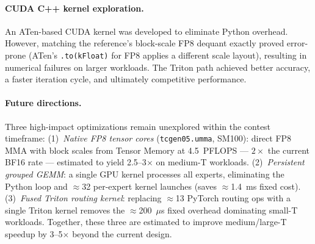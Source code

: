 \paragraph{CUDA C++ kernel exploration.}
An ATen-based CUDA kernel was developed to eliminate Python overhead.
However, matching the reference's block-scale FP8 dequant exactly proved error-prone (ATen's \texttt{.to(kFloat)} for FP8 applies a different scale layout), resulting in numerical failures on larger workloads.
The Triton path achieved better accuracy, a faster iteration cycle, and ultimately competitive performance.

\paragraph{Future directions.}
Three high-impact optimizations remain unexplored within the contest timeframe:
(1)~\emph{Native FP8 tensor cores} (\texttt{tcgen05.umma}, SM100): direct FP8 MMA with block scales from Tensor Memory at 4.5~PFLOPS --- $2\times$ the current BF16 rate --- estimated to yield 2.5--3$\times$ on medium-T workloads.
(2)~\emph{Persistent grouped GEMM}: a single GPU kernel processes all experts, eliminating the Python loop and ${\approx}$32 per-expert kernel launches (saves ${\approx}$1.4~ms fixed cost).
(3)~\emph{Fused Triton routing kernel}: replacing ${\approx}$13 PyTorch routing ops with a single Triton kernel removes the ${\approx}$200~$\mu$s fixed overhead dominating small-T workloads.
Together, these three are estimated to improve medium/large-T speedup by 3--5$\times$ beyond the current design.
